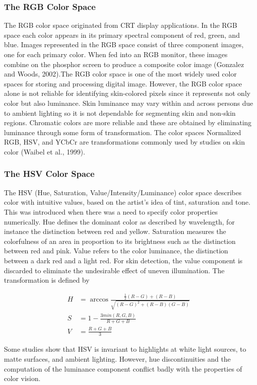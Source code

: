 \subsubsection{The RGB Color Space}
The RGB color space originated from CRT display applications.  In the RGB space each color appears in its primary spectral component of red, green, and blue.  Images represented in the RGB space consist of three component images, one for each primary color.  When fed into an RGB monitor, these images combine on the phosphor screen to produce a composite  color image (Gonzalez and Woods, 2002).The RGB color space is one of the most widely used color spaces for storing and processing digital image.  However, the RGB color space alone is not reliable for identifying skin-colored pixels since it represents not only color but also luminance.  Skin luminance may vary within and across persons due to ambient lighting so it is not dependable for segmenting skin and non-skin regions.   Chromatic colors are more reliable and these are obtained by eliminating luminance through some form of transformation.  The color spaces Normalized RGB, HSV, and YCbCr are transformations commonly used by studies on skin color (Waibel et al., 1999).


\subsubsection{The HSV Color Space}
The HSV (Hue, Saturation, Value/Intensity/Luminance) color space describes
color with intuitive values, based on the artist's idea of tint, saturation and tone.  This was introduced when there was a need to specify color properties numerically.  Hue defines the dominant color as described by wavelength, for instance the distinction between red and yellow.   Saturation measures the colorfulness of an area in proportion to its brightness such as the distinction between red and pink.   Value refers to the color luminance, the distinction between a dark red and a light  red. For skin detection, the value component is discarded to eliminate the undesirable effect of uneven illumination.  The transformation is defined by

\begin{align}
H&=\arccos\frac{\frac{1}{2} (R-G)+ (R-B)}{\sqrt{(R-G)^2 + (R-B)(G-B)}}\\
S&=1-\frac{3min(R,G,B)}{R+G+B}\\
V&=\frac{R+G+ B}{3}
\end{align}

Some studies show that HSV is invariant to highlights at white light sources, to matte surfaces, and ambient lighting. However, hue discontinuities and the computation of the luminance component conflict badly with the properties of color vision.

